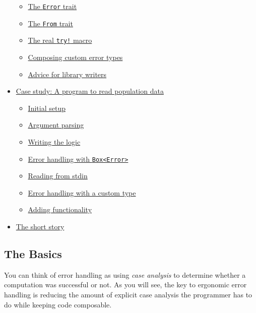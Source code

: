 \documentclass[a4paper,]{book}
\providecommand{\tightlist}{%
  \setlength{\itemsep}{0pt}\setlength{\parskip}{0pt}}
\begin{document}
\begin{itemize}
  \begin{itemize}
  \tightlist
  \item
    \protect\hyperlink{the-error-trait}{The \texttt{Error} trait}
  \item
    \protect\hyperlink{the-from-trait}{The \texttt{From} trait}
  \item
    \protect\hyperlink{the-real-try-macro}{The real \texttt{try!} macro}
  \item
    \protect\hyperlink{composing-custom-error-types}{Composing custom
    error types}
  \item
    \protect\hyperlink{advice-for-library-writers}{Advice for library
    writers}
  \end{itemize}
\item
  \protect\hyperlink{case-study-a-program-to-read-population-data}{Case
  study: A program to read population data}

  \begin{itemize}
  \tightlist
  \item
    \protect\hyperlink{initial-setup}{Initial setup}
  \item
    \protect\hyperlink{argument-parsing}{Argument parsing}
  \item
    \protect\hyperlink{writing-the-logic}{Writing the logic}
  \item
    \protect\hyperlink{error-handling-with-boxerror}{Error handling with
    \texttt{Box\textless{}Error\textgreater{}}}
  \item
    \protect\hyperlink{reading-from-stdin}{Reading from stdin}
  \item
    \protect\hyperlink{error-handling-with-a-custom-type}{Error handling
    with a custom type}
  \item
    \protect\hyperlink{adding-functionality}{Adding functionality}
  \end{itemize}
\item
  \protect\hyperlink{the-short-story}{The short story}
\end{itemize}

\hypertarget{the-basics}{\subsection{The Basics}\label{the-basics}}

You can think of error handling as using \emph{case analysis} to
determine whether a computation was successful or not. As you will see,
the key to ergonomic error handling is reducing the amount of explicit
case analysis the programmer has to do while keeping code composable.
\end{document}
